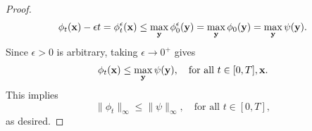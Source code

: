 \documentclass[10pt,a4paper]{amsart}
\newcommand{\bfx}{{\bf x}}
\newcommand{\bfy}{ {\bf y}}
\begin{document}
\begin{proof}
    \begin{equation*}
        \phi_t(\bfx)-\epsilon t= \phi_t^\epsilon(\bfx) \leq \max_\bfy \phi_0^\epsilon(\bfy) = \max_\bfy \phi_0(\bfy)= \max_\bfy \psi(\bfy).
    \end{equation*}
    Since $\epsilon>0$ is arbitrary, taking $\epsilon \to 0^+$ gives
    \begin{equation*}
        \phi_t(\bfx) \leq \max_\bfy \psi(\bfy), \quad \text{for all $t \in [0, T], \bfx$}.
    \end{equation*}
    This implies 
    $$
    \| \phi_t \|_\infty \leq \| \psi \|_\infty, \quad \text{for all $t \in [0, T]$},
    $$
    as desired.
\end{proof}
\end{document}
